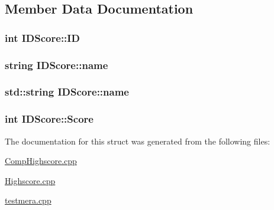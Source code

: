 \subsection{Member Data Documentation}
\hypertarget{structIDScore_aa922f6f013ed4fcbd873b5a218aaf35d}{
\subsubsection[{I\-D}]{\setlength{\rightskip}{0pt plus 5cm}int I\-D\-Score\-::\-I\-D}}\label{structIDScore_aa922f6f013ed4fcbd873b5a218aaf35d}
\hypertarget{structIDScore_a8c84842bb34c060bde8a3f9d5ee462a5}{
\subsubsection[{name}]{\setlength{\rightskip}{0pt plus 5cm}string I\-D\-Score\-::name}}\label{structIDScore_a8c84842bb34c060bde8a3f9d5ee462a5}
\hypertarget{structIDScore_ab16cc900e480c63706a899f89ececc71}{
\subsubsection[{name}]{\setlength{\rightskip}{0pt plus 5cm}std\-::string I\-D\-Score\-::name}}\label{structIDScore_ab16cc900e480c63706a899f89ececc71}
\hypertarget{structIDScore_a7aa85c456227f2ac20dd7b55383daa4f}{
\subsubsection[{Score}]{\setlength{\rightskip}{0pt plus 5cm}int I\-D\-Score\-::\-Score}}\label{structIDScore_a7aa85c456227f2ac20dd7b55383daa4f}


The documentation for this struct was generated from the following files\-:\begin{DoxyCompactItemize}
\item 
\hyperlink{CompHighscore_8cpp}{Comp\-Highscore.\-cpp}\item 
\hyperlink{Highscore_8cpp}{Highscore.\-cpp}\item 
\hyperlink{testmera_8cpp}{testmera.\-cpp}\end{DoxyCompactItemize}
